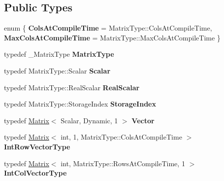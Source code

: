 \subsection*{Public Types}
\begin{DoxyCompactItemize}
\item 
\mbox{\label{class_eigen_1_1_umf_pack_l_u_abe7ba9ed0f96d9292b742ab92649212a}} 
enum \{ {\bfseries Cols\+At\+Compile\+Time} = Matrix\+Type\+::Cols\+At\+Compile\+Time, 
{\bfseries Max\+Cols\+At\+Compile\+Time} = Matrix\+Type\+::Max\+Cols\+At\+Compile\+Time
 \}
\item 
\mbox{\label{class_eigen_1_1_umf_pack_l_u_aa85376b53299c17d415b99a48ad64f76}} 
typedef \+\_\+\+Matrix\+Type {\bfseries Matrix\+Type}
\item 
\mbox{\label{class_eigen_1_1_umf_pack_l_u_a625a5b4478cb698e878db8ca83785371}} 
typedef Matrix\+Type\+::\+Scalar {\bfseries Scalar}
\item 
\mbox{\label{class_eigen_1_1_umf_pack_l_u_a578eb1ae6d86e048cf4ca1d3ef5b2267}} 
typedef Matrix\+Type\+::\+Real\+Scalar {\bfseries Real\+Scalar}
\item 
\mbox{\label{class_eigen_1_1_umf_pack_l_u_a8514e6012b9f99251e088cb4a5188408}} 
typedef Matrix\+Type\+::\+Storage\+Index {\bfseries Storage\+Index}
\item 
\mbox{\label{class_eigen_1_1_umf_pack_l_u_a8be64e184384e92d68b90ed69ae8e20c}} 
typedef \mbox{\hyperlink{class_eigen_1_1_matrix}{Matrix}}$<$ Scalar, Dynamic, 1 $>$ {\bfseries Vector}
\item 
\mbox{\label{class_eigen_1_1_umf_pack_l_u_a90d91ae46799346e6352a78e3500adcf}} 
typedef \mbox{\hyperlink{class_eigen_1_1_matrix}{Matrix}}$<$ int, 1, Matrix\+Type\+::\+Cols\+At\+Compile\+Time $>$ {\bfseries Int\+Row\+Vector\+Type}
\item 
\mbox{\label{class_eigen_1_1_umf_pack_l_u_ac0bc3049980785317785bbe428a4e2e9}} 
typedef \mbox{\hyperlink{class_eigen_1_1_matrix}{Matrix}}$<$ int, Matrix\+Type\+::\+Rows\+At\+Compile\+Time, 1 $>$ {\bfseries Int\+Col\+Vector\+Type}

\end{DoxyCompactItemize}
